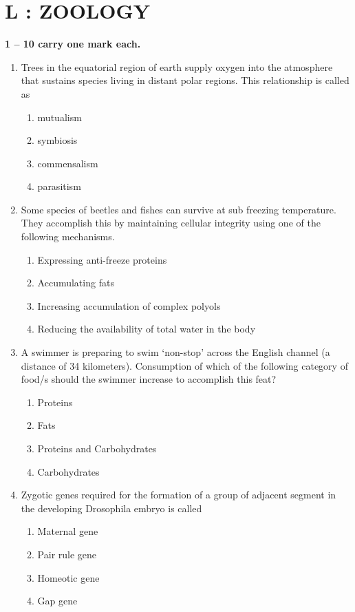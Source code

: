 \documentclass[journal,12pt,onecolumn]{IEEEtran}
\begin{document}
\section*{\centering L : ZOOLOGY}
\noindent \textbf{ 1 --  10 carry one mark each.}
\begin{enumerate}[label=\arabic*.]
\item Trees in the equatorial region of earth supply oxygen into the atmosphere that sustains species living in distant polar regions. This relationship is called as
\begin{multicols}{4}
\begin{enumerate}[label=(\Alph*)]
\item mutualism
\item symbiosis
\item commensalism
\item parasitism
\end{enumerate}
\end{multicols}

\item Some species of beetles and fishes can survive at sub freezing temperature. They accomplish this by maintaining cellular integrity using one of the following mechanisms.
\begin{enumerate}[label=(\Alph*)]
\item Expressing anti-freeze proteins
\item Accumulating fats
\item Increasing accumulation of complex polyols
\item Reducing the availability of total water in the body
\end{enumerate}

\item A swimmer is preparing to swim ‘non-stop’ across the English channel (a distance of 34 kilometers). Consumption of which of the following category of food/s should the swimmer increase to accomplish this feat?
\begin{multicols}{2}
\begin{enumerate}[label=(\Alph*)]
\item Proteins
\item Fats
\item Proteins and Carbohydrates
\item Carbohydrates
\end{enumerate}
\end{multicols}

\item Zygotic genes required for the formation of a group of adjacent segment in the developing Drosophila embryo is called
\begin{multicols}{4}
\begin{enumerate}[label=(\Alph*)]
\item Maternal gene
\item Pair rule gene
\item Homeotic gene
\item Gap gene
\end{enumerate}
\end{multicols}


\end{enumerate}
\end{document}

